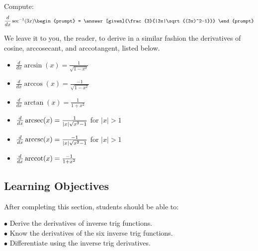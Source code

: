 \documentclass{ximera}
\begin{document}
\begin{question}
  Compute:
  \[
  \frac{d}{dx} \sec^{-1}(3x)
  \begin{prompt}
    = \answer[given]{\frac{3}{|3x|\sqrt{(3x)^2-1}}}
  \end{prompt}
  \]
\end{question}

We leave it to you, the reader, to derive in a similar fashion the derivatives of
cosine, arccosecant, and arccotangent, listed below.

\begin{theorem} \hfil
\begin{itemize}
\item $\frac{d}{dx} \arcsin(x) = \frac{1}{\sqrt{1-x^2}}$
\item $\frac{d}{dx} \arccos(x) = \frac{-1}{\sqrt{1-x^2}}$
\item $\frac{d}{dx} \arctan(x) = \frac{1}{1+x^2}$
\item $\frac{d}{dx} \operatorname{arcsec}(x) = \frac{1}{|x|\sqrt{x^2-1}}$ for $|x|>1$
\item $\frac{d}{dx} \operatorname{arccsc}(x) = \frac{-1}{|x|\sqrt{x^2-1}}$ for $|x|>1$
\item $\frac{d}{dx}  \operatorname{arccot}(x) = \frac{-1}{1+x^2}$
\end{itemize}
\end{theorem}

\subsection{Learning Objectives}
After completing this section, students should be able to:
\vspace{.05in}

\noindent$\bullet$ Derive the derivatives of inverse trig functions.
\\$\bullet$ Know the derivatives of the six inverse trig functions.
\\$\bullet$ Differentiate using the inverse trig derivatives.

\end{document}
